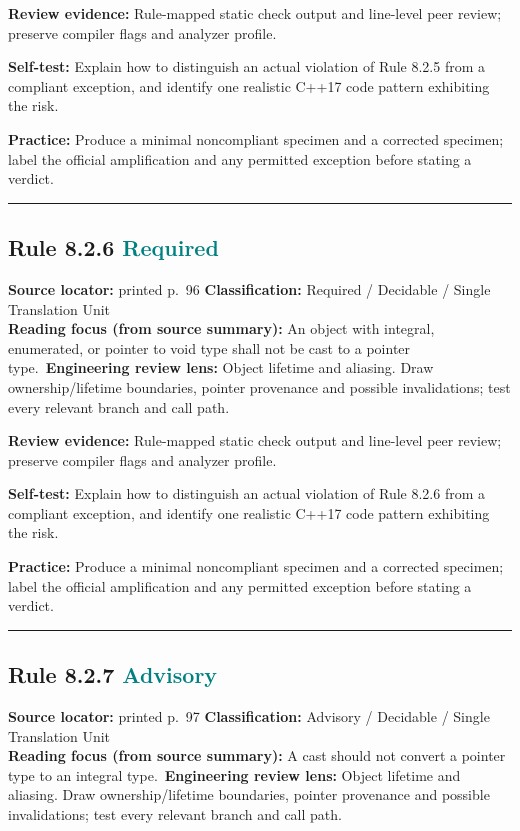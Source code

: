 \documentclass[10pt,letterpaper]{article}
\begin{document}
\textbf{Review evidence:} Rule-mapped static check output and line-level peer review; preserve compiler flags and analyzer profile.

\textbf{Self-test:} Explain how to distinguish an actual violation of Rule 8.2.5 from a compliant exception, and identify one realistic C++17 code pattern exhibiting the risk.\par
\textbf{Practice:} Produce a minimal noncompliant specimen and a corrected specimen; label the official amplification and any permitted exception before stating a verdict.
\smallskip\hrule\smallskip
\subsection*{Rule 8.2.6 \enspace \texorpdfstring{\small\textcolor{teal}{Required}}{Required}}
\noindent\textbf{Source locator:} printed p.~96 \quad\textbf{Classification:} Required / Decidable / Single Translation Unit\\
\textbf{Reading focus (from source summary):} An object with integral, enumerated, or pointer to void type shall not be cast to a pointer type.\
\textbf{Engineering review lens:} Object lifetime and aliasing. Draw ownership/lifetime boundaries, pointer provenance and possible invalidations; test every relevant branch and call path.

\textbf{Review evidence:} Rule-mapped static check output and line-level peer review; preserve compiler flags and analyzer profile.

\textbf{Self-test:} Explain how to distinguish an actual violation of Rule 8.2.6 from a compliant exception, and identify one realistic C++17 code pattern exhibiting the risk.\par
\textbf{Practice:} Produce a minimal noncompliant specimen and a corrected specimen; label the official amplification and any permitted exception before stating a verdict.
\smallskip\hrule\smallskip
\subsection*{Rule 8.2.7 \enspace \texorpdfstring{\small\textcolor{teal}{Advisory}}{Advisory}}
\noindent\textbf{Source locator:} printed p.~97 \quad\textbf{Classification:} Advisory / Decidable / Single Translation Unit\\
\textbf{Reading focus (from source summary):} A cast should not convert a pointer type to an integral type.\
\textbf{Engineering review lens:} Object lifetime and aliasing. Draw ownership/lifetime boundaries, pointer provenance and possible invalidations; test every relevant branch and call path.
\end{document}
